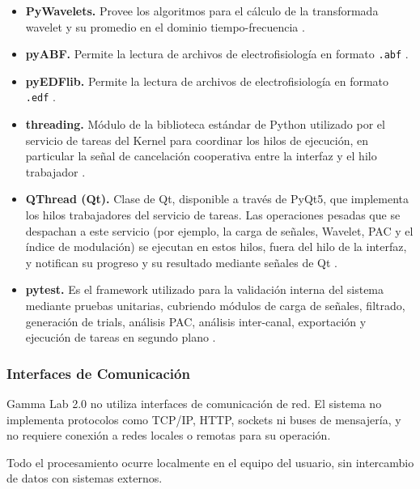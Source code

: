 \documentclass[12pt, letterpaper]{article}
\begin{document}
\begin{itemize}
    \item \textbf{PyWavelets.} Provee los algoritmos para el cálculo de la
    transformada wavelet y su promedio en el dominio tiempo-frecuencia \cite{ref8}.

    \item \textbf{pyABF.} Permite la lectura de archivos de
    electrofisiología en formato \texttt{.abf} \cite{ref9}.

    \item \textbf{pyEDFlib.} Permite la lectura de archivos de
    electrofisiología en formato \texttt{.edf} \cite{ref10}.

    \item \textbf{threading.} Módulo de la biblioteca estándar de Python
    utilizado por el servicio de tareas del Kernel para coordinar los hilos de
    ejecución, en particular la señal de cancelación cooperativa entre la
    interfaz y el hilo trabajador \cite{ref11}.

    \item \textbf{QThread (Qt).} Clase de Qt, disponible a través de PyQt5,
    que implementa los hilos trabajadores del servicio de tareas. Las
    operaciones pesadas que se despachan a este servicio (por ejemplo, la
    carga de señales, Wavelet, PAC y el índice de modulación) se ejecutan en
    estos hilos, fuera del hilo de la interfaz, y notifican su progreso y su
    resultado mediante señales de Qt \cite{ref12}.

    \item \textbf{pytest.} Es el framework utilizado para la validación
    interna del sistema mediante pruebas unitarias, cubriendo módulos de
    carga de señales, filtrado, generación de trials, análisis PAC,
    análisis inter-canal, exportación y ejecución de tareas en segundo plano \cite{ref13}.

\end{itemize}

\subsubsection{Interfaces de Comunicación}

Gamma Lab 2.0 no utiliza interfaces de comunicación de red. El sistema no
implementa protocolos como TCP/IP, HTTP, sockets ni buses de mensajería, y no
requiere conexión a redes locales o remotas para su operación.

Todo el procesamiento ocurre localmente en el equipo del usuario, sin
intercambio de datos con sistemas externos.
\end{document}

